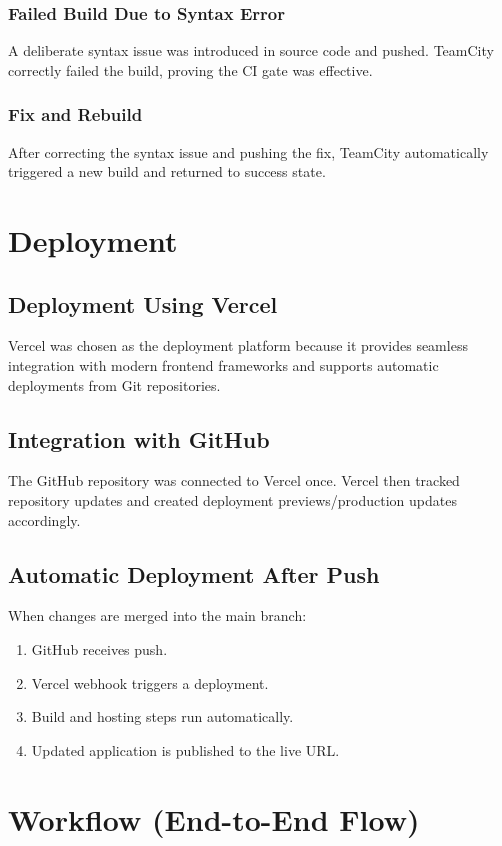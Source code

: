 \documentclass[12pt,a4paper]{report}
\begin{document}
\subsection{Failed Build Due to Syntax Error}
A deliberate syntax issue was introduced in source code and pushed. TeamCity correctly failed the build, proving the CI gate was effective.

\subsection{Fix and Rebuild}
After correcting the syntax issue and pushing the fix, TeamCity automatically triggered a new build and returned to success state.

\chapter{Deployment}
\section{Deployment Using Vercel}
Vercel was chosen as the deployment platform because it provides seamless integration with modern frontend frameworks and supports automatic deployments from Git repositories.

\section{Integration with GitHub}
The GitHub repository was connected to Vercel once. Vercel then tracked repository updates and created deployment previews/production updates accordingly.

\section{Automatic Deployment After Push}
When changes are merged into the main branch:
\begin{enumerate}[leftmargin=1.2cm]
    \item GitHub receives push.
    \item Vercel webhook triggers a deployment.
    \item Build and hosting steps run automatically.
    \item Updated application is published to the live URL.
\end{enumerate}

\chapter{Workflow (End-to-End Flow)}
\end{document}
